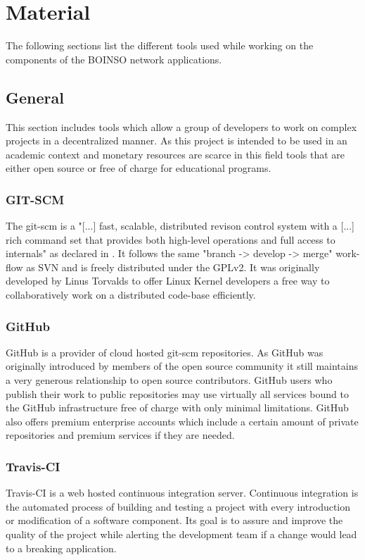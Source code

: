 \documentclass[BachelorPaper]{subfiles}
\begin{document}
\chapter{Material}
The following sections list the different tools used while working on the components of the BOINSO network applications.

\section{General}
\label{sec:mat_general}
This section includes tools which allow a group of developers to work on complex projects in a decentralized manner. As this project is intended to be used in an academic context and monetary resources are scarce in this field tools that are either open source or free of charge for educational programs.

\subsection{GIT-SCM}
\label{subsec:mat_git}
The \ac{git-scm} is a "[...] fast, scalable, distributed revison control system with a [...] rich command set that provides both high-level operations and full access to internals" as declared in \cite{git_scm}. It follows the same "branch -> develop -> merge" work-flow as \ac{SVN} and is freely distributed under the \ac{GPLv2}. It was originally developed by Linus Torvalds to offer Linux Kernel developers a free way to collaboratively work on a distributed code-base efficiently.

\subsection{GitHub}
\label{subsec:mat_github}
GitHub is a provider of cloud hosted \ac{git-scm} repositories. As GitHub was originally introduced by members of the open source community it still maintains a very generous relationship to open source contributors. GitHub users who publish their work to public repositories may use virtually all services bound to the GitHub infrastructure free of charge with only minimal limitations. GitHub also offers premium enterprise accounts which include a certain amount of private repositories and premium services if they are needed.

\subsection{Travis-CI}
\label{subsec:mat_travis}
Travis-CI is a web hosted continuous integration server. Continuous integration is the automated process of building and testing a project with every introduction or modification of a software component. Its goal is to assure and improve the quality of the project while alerting the development team if a change would lead to a breaking application.\\
\end{document}
